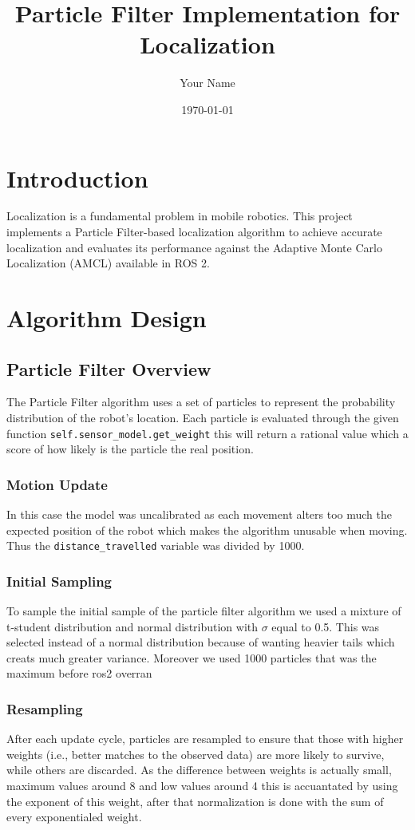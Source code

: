 \documentclass[11pt]{article}
\title{Particle Filter Implementation for Localization}
\author{Your Name}
\date{\today}
\begin{document}
\maketitle


\section{Introduction}
Localization is a fundamental problem in mobile robotics. This project implements a Particle Filter-based localization algorithm to achieve accurate localization and evaluates its performance against the Adaptive Monte Carlo Localization (AMCL) available in ROS 2.

\section{Algorithm Design}

\subsection{Particle Filter Overview}
The Particle Filter algorithm uses a set of particles to represent the probability distribution of the robot's location. Each particle is evaluated through the given function \texttt{self.sensor\_model.get\_weight} this will return a rational value which a score of how likely is the particle the real position. 

\subsubsection{Motion Update}
In this case the model was uncalibrated as each movement alters too much the expected position of the robot which makes the algorithm unusable when moving. Thus the \texttt{distance\_travelled} variable was divided by 1000. 

\subsubsection{Initial Sampling}
To sample the initial sample of the particle filter algorithm we used a mixture of t-student distribution and normal distribution with $\sigma$ equal to 0.5. 
This was selected instead of a normal distribution because of wanting heavier tails which creats much greater variance. Moreover we used 1000 particles that was the maximum before ros2  overran 

\subsubsection{Resampling}
After each update cycle, particles are resampled to ensure that those with higher weights (i.e., better matches to the observed data) are more likely to survive, while others are discarded. As the difference between weights is actually small, maximum values around 8 and low values around 4 this is accuantated by using the exponent of this weight, after that normalization is done with the sum of every exponentialed weight. 
\end{document}

